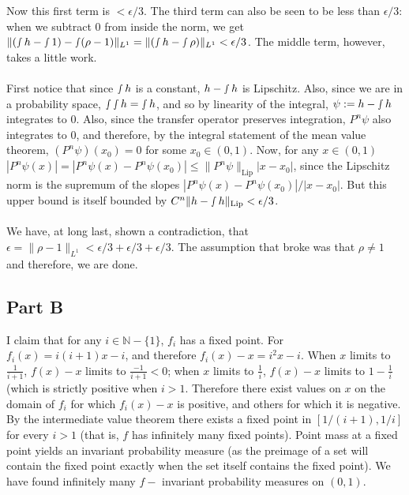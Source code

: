 \documentclass[10pt,a4paper]{article}
\begin{document}
Now this first term is $<\epsilon/3$. The third term can also be seen to be less than $\epsilon/3$: when we subtract 0 from inside the norm, we get $\|(\smallint h-\smallint 1)-\smallint(\rho-1)\|_{L^1}=\|(\smallint h-\smallint \rho)\|_{L^1}<\epsilon/3$. The middle term, however, takes a little work.\\\\
First notice that since $\smallint h$ is a constant, $h-\smallint h$ is Lipschitz. Also, since we are in a probability space, $\smallint\smallint h=\smallint h$, and so by linearity of the integral, $\psi:=h-\smallint h$ integrates to 0. Also, since the transfer operator preserves integration, $P^n\psi$ also integrates to 0, and  therefore, by the integral statement of the mean value theorem, $(P^n\psi)(x_0)=0$ for some $x_0\in(0,1)$. Now, for any $x\in(0,1)$ $|P^n\psi(x)|=|P^n\psi(x)-P^n\psi(x_0)|\leq\|P^n\psi\|_{\text{Lip}}|x-x_0|$, since the Lipschitz norm is the supremum of the slopes $|P^n\psi(x)-P^n\psi(x_0)|/|x-x_0|$. But this upper bound is itself bounded by $C^n\|h-\smallint h\|_{\text{Lip}}<\epsilon/3$.\\\\
We have, at long last, shown a contradiction, that $\epsilon=\|\rho-1\|_{L^1}<\epsilon/3+\epsilon/3+\epsilon/3$. The assumption that broke was that $\rho\neq 1$ and therefore, we are done.
\subsection*{Part B}
I claim that for any $i\in\mathbb{N}-\{1\}$, $f_i$ has a fixed point. For $f_i(x)=i(i+1)x-i$, and therefore $f_i(x)-x=i^2x-i$. When $x$ limits to $\frac{1}{i+1}$, $f(x)-x$ limits to $\frac{-1}{i+1}<0$; when $x$ limits to $\frac{1}{i}$, $f(x)-x$ limits to $1-\frac{1}{i}$ (which is strictly positive when $i>1$. Therefore there exist values on $x$ on the domain of $f_i$ for which $f_i(x)-x$ is positive, and others for which it is negative. By the intermediate value theorem there exists a fixed point in $[1/(i+1),1/i]$ for every $i>1$ (that is, $f$ has infinitely many fixed points). Point mass at a fixed point yields an invariant probability measure (as the preimage of a set will contain the fixed point exactly when the set itself contains the fixed point). We have found infinitely many $f-$ invariant probability measures on $(0,1)$. 
\end{document}
